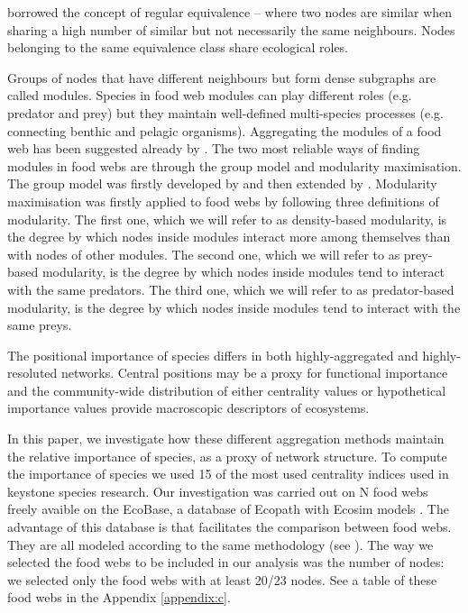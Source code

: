 \documentclass[twocolumn]{article}
\begin{document}
	\citet{Luczkovich2003} borrowed the concept of regular equivalence – where two nodes are similar when sharing a high number of similar but not necessarily the same neighbours. Nodes belonging to the same equivalence class share ecological roles.
	\par
	Groups of nodes that have different neighbours but form dense subgraphs are called modules. Species in food web modules can play different roles (e.g. predator and prey) but they maintain well-defined multi-species processes (e.g. connecting benthic and pelagic organisms). Aggregating the modules of a food web has been suggested already by \citet{Allesina2009a}.
	The two most reliable ways of finding modules in food webs are through the group model and modularity maximisation. The group model was firstly developed by \citet{Allesina2009a} and then extended by \citet{Sander2015}.	Modularity maximisation was firstly applied to food webs by \citet{Guimera2010} following three definitions of modularity.	The first one, which we will refer to as density-based modularity, is the degree by which nodes inside modules interact more among themselves than with nodes of other modules.	The second one, which we will refer to as prey-based modularity, is the degree by which nodes inside modules tend to interact with the same predators.	The third one, which we will refer to as predator-based modularity, is the degree by which nodes inside modules tend to interact with the same preys.
	\par
	The positional importance of species differs in both highly-aggregated and highly-resoluted networks. Central positions may be a proxy for functional importance and the community-wide distribution of either centrality values \citep{Bauer2010} or hypothetical importance values \citep{Mills1993} provide macroscopic descriptors of ecosystems.
	\par %
	In this paper, we investigate how these different aggregation methods maintain the relative importance of species, as a proxy of network structure.
	To compute the importance of species we used 15 of the most used centrality indices used in keystone species research.
	Our investigation was carried out on N food webs freely avaible on the EcoBase, a database of Ecopath with Ecosim models \citep{Colleter2013}. The advantage of this database is that facilitates the comparison between food webs. They are all modeled according to the same methodology (see \citet{Okey2004}). The way we selected the food webs to be included in our analysis was the number of nodes: we selected only the food webs with at least 20/23 nodes. See a table of these food webs in the Appendix \ref{appendix:c}.
\end{document}
